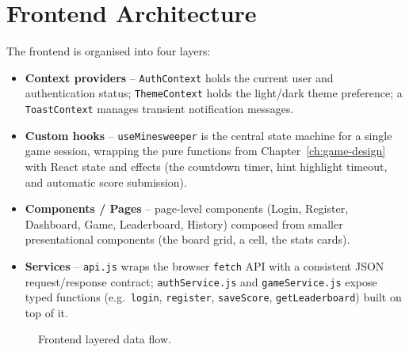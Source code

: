\section{Frontend Architecture}
The frontend is organised into four layers:
\begin{itemize}[nosep]
    \item \textbf{Context providers} -- \texttt{AuthContext} holds the
    current user and authentication status; \texttt{ThemeContext} holds the
    light/dark theme preference; a \texttt{ToastContext} manages transient
    notification messages.
    \item \textbf{Custom hooks} -- \texttt{useMinesweeper} is the central
    state machine for a single game session, wrapping the pure functions
    from Chapter~\ref{ch:game-design} with React state and effects (the
    countdown timer, hint highlight timeout, and automatic score
    submission).
    \item \textbf{Components / Pages} -- page-level components
    (Login, Register, Dashboard, Game, Leaderboard, History) composed from
    smaller presentational components (the board grid, a cell, the
    stats cards).
    \item \textbf{Services} -- \texttt{api.js} wraps the browser
    \texttt{fetch} API with a consistent JSON request/response contract;
    \texttt{authService.js} and \texttt{gameService.js} expose
    typed functions (e.g.\ \texttt{login}, \texttt{register},
    \texttt{saveScore}, \texttt{getLeaderboard}) built on top of it.
\end{itemize}

\begin{figure}[h]
\centering
{}
\caption{Frontend layered data flow.}
\label{fig:frontend-layers}
\end{figure}

